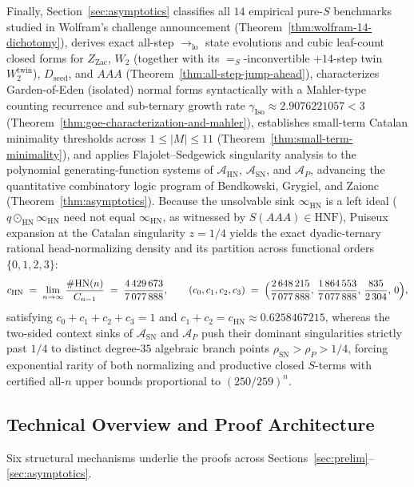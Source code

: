 \documentclass[11pt,reqno]{amsart}
\numberwithin{equation}{section}
\theoremstyle{plain}
\theoremstyle{definition}
\theoremstyle{remark}
\newcommand{\HNF}{\mathrm{HNF}}
\newcommand{\SN}{\mathrm{SN}}
\newcommand{\HN}{\mathrm{HN}}
\begin{document}
Finally, Section~\ref{sec:asymptotics} classifies all $14$ empirical pure-$S$ benchmarks studied in Wolfram's challenge announcement \cite{Wolfram2021Challenge} (Theorem~\ref{thm:wolfram-14-dichotomy}), derives exact all-step $\to_{\mathrm{lo}}$ state evolutions and cubic leaf-count closed forms for $Z_{\mathrm{Zac}}$, $W_2$ (together with its $=_S$-inconvertible $+14$-step twin $W_2^{\mathrm{twin}}$), $D_{\mathrm{seed}}$, and $A A A$ (Theorem~\ref{thm:all-step-jump-ahead}), characterizes Garden-of-Eden (isolated) normal forms syntactically with a Mahler-type counting recurrence and sub-ternary growth rate $\gamma_{\mathrm{Iso}} \approx 2.9076221057 < 3$ (Theorem~\ref{thm:goe-characterization-and-mahler}), establishes small-term Catalan minimality thresholds across $1 \le |M| \le 11$ (Theorem~\ref{thm:small-term-minimality}), and applies Flajolet--Sedgewick singularity analysis \cite{FlajoletSedgewick2009} to the polynomial generating-function systems of $\mathcal{A}_{\HN}$, $\mathcal{A}_{\SN}$, and $\mathcal{A}_P$, advancing the quantitative combinatory logic program of Bendkowski, Grygiel, and Zaionc \cite{BendkowskiGrygielZaionc2017} (Theorem~\ref{thm:asymptotics}). Because the unsolvable sink $\infty_{\HN}$ is a left ideal ($q \odot_{\HN} \infty_{\HN}$ need not equal $\infty_{\HN}$, as witnessed by $S(A A A) \in \HNF$), Puiseux expansion at the Catalan singularity $z = 1/4$ yields the exact dyadic-ternary rational head-normalizing density and its partition across functional orders $\{0, 1, 2, 3\}$:
\[
  c_{\HN} \;=\; \lim_{n \to \infty} \frac{\#\HN(n)}{C_{n-1}} \;=\; \frac{4\,429\,673}{7\,077\,888},
  \qquad
  (c_0, c_1, c_2, c_3) \;=\; \Bigl(\frac{2\,648\,215}{7\,077\,888},\, \frac{1\,864\,553}{7\,077\,888},\, \frac{835}{2\,304},\, 0\Bigr),
\]
satisfying $c_0 + c_1 + c_2 + c_3 = 1$ and $c_1 + c_2 = c_{\HN} \approx 0.6258467215$, whereas the two-sided context sinks of $\mathcal{A}_{\SN}$ and $\mathcal{A}_P$ push their dominant singularities strictly past $1/4$ to distinct degree-$35$ algebraic branch points $\rho_{\SN} > \rho_P > 1/4$, forcing exponential rarity of both normalizing and productive closed $S$-terms with certified all-$n$ upper bounds proportional to $(250/259)^n$.

\subsection{Technical Overview and Proof Architecture}\label{subsec:intro-overview}

Six structural mechanisms underlie the proofs across Sections~\ref{sec:prelim}--\ref{sec:asymptotics}.
\end{document}
